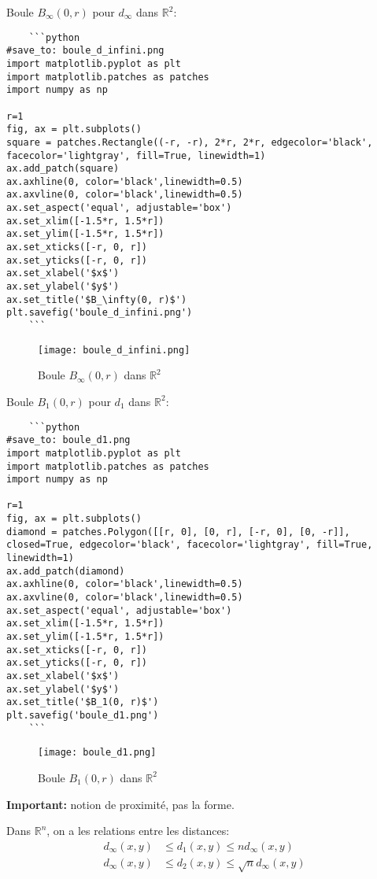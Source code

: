 \documentclass[oneside]{book}
\begin{document}
\begin{example}
\begin{enumerate}
    Boule $B_\infty(0, r)$ pour $d_\infty$ dans $\mathbb{R}^2$:

    \begin{verbatim}
    ```python
#save_to: boule_d_infini.png
import matplotlib.pyplot as plt
import matplotlib.patches as patches
import numpy as np

r=1
fig, ax = plt.subplots()
square = patches.Rectangle((-r, -r), 2*r, 2*r, edgecolor='black', facecolor='lightgray', fill=True, linewidth=1)
ax.add_patch(square)
ax.axhline(0, color='black',linewidth=0.5)
ax.axvline(0, color='black',linewidth=0.5)
ax.set_aspect('equal', adjustable='box')
ax.set_xlim([-1.5*r, 1.5*r])
ax.set_ylim([-1.5*r, 1.5*r])
ax.set_xticks([-r, 0, r])
ax.set_yticks([-r, 0, r])
ax.set_xlabel('$x$')
ax.set_ylabel('$y$')
ax.set_title('$B_\infty(0, r)$')
plt.savefig('boule_d_infini.png')
    ```
    \end{verbatim}

    \begin{figure}[H]
        \centering
        \texttt{[image: boule\_d\_infini.png]}
        \caption{Boule $B_\infty(0, r)$ dans $\mathbb{R}^2$}
        \label{fig:boule_d_infini}
    \end{figure}

        Boule $B_1(0, r)$ pour $d_1$ dans $\mathbb{R}^2$:

    \begin{verbatim}
    ```python
#save_to: boule_d1.png
import matplotlib.pyplot as plt
import matplotlib.patches as patches
import numpy as np

r=1
fig, ax = plt.subplots()
diamond = patches.Polygon([[r, 0], [0, r], [-r, 0], [0, -r]], closed=True, edgecolor='black', facecolor='lightgray', fill=True, linewidth=1)
ax.add_patch(diamond)
ax.axhline(0, color='black',linewidth=0.5)
ax.axvline(0, color='black',linewidth=0.5)
ax.set_aspect('equal', adjustable='box')
ax.set_xlim([-1.5*r, 1.5*r])
ax.set_ylim([-1.5*r, 1.5*r])
ax.set_xticks([-r, 0, r])
ax.set_yticks([-r, 0, r])
ax.set_xlabel('$x$')
ax.set_ylabel('$y$')
ax.set_title('$B_1(0, r)$')
plt.savefig('boule_d1.png')
    ```
    \end{verbatim}

    \begin{figure}[H]
        \centering
        \texttt{[image: boule\_d1.png]}
        \caption{Boule $B_1(0, r)$ dans $\mathbb{R}^2$}
        \label{fig:boule_d1}
    \end{figure}

    \begin{remark}
    \textbf{Important:} notion de proximité, pas la forme.
    \end{remark}

    Dans $\mathbb{R}^n$, on a les relations entre les distances:
    \begin{align*}
        d_\infty(x, y) &\leq d_1(x, y) \leq n d_\infty(x, y) \\
        d_\infty(x, y) &\leq d_2(x, y) \leq \sqrt{n} d_\infty(x, y)
    \end{align*}
\end{enumerate}
\end{example}
\end{document}
